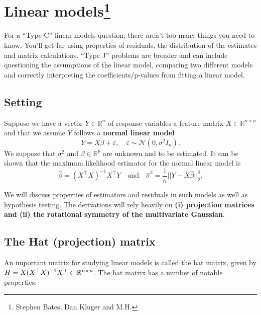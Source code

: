 \section{Linear models\footnote{Stephen Bates, Dan Kluger and M.H.}}

For a ``Type C'' linear models question, there aren't too many things you need to know. You'll get far using properties of residuals, the distribution of the estimates and matrix calculations. ``Type J'' problems are broader and can include questioning the assumptions of the linear model, comparing two different models and correctly interpreting the coefficients/p-values from fitting a linear model.


\subsection{Setting}

Suppose we have a vector $Y \in \mathbb{R}^n$ of response variables a feature matrix $X \in \mathbb{R}^{n \times p}$ and that we assume $Y$ follows a \textbf{normal linear model} $$Y= X \beta +\varepsilon, \quad \varepsilon \sim \mathcal{N}(0,\sigma^2 I_n).$$ We suppose that $\sigma^2$ and $\beta \in \mathbb{R}^p$ are unknown and to be estimated. It can be shown that the maximum likelihood estimator for the normal linear model is 
\begin{equation}\label{eq:normalLM_MLE}
\hat{\beta} = (X^\top X)^{-1} X^\top Y \quad \text{and} \quad \hat{\sigma}^2 = \frac{1}{n} \vert \vert Y - X \hat{\beta} \vert \vert_2^2.
\end{equation}

We will discuss properties of estimators and residuals in such models as well as hypothesis testing. The derivations will rely heavily on \textbf{ (i) projection matrices and (ii) the rotational symmetry of the multivariate Gaussian}.

\subsection{The Hat (projection) matrix}

An important matrix for studying linear models is called the hat matrix, given by $H= X (X^\top X)^{-1} X^\top \in {\mathbb R}^{n \times n}$. The hat matrix has a number of notable properties:

